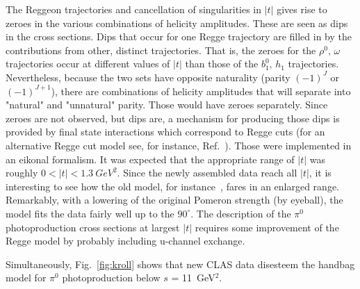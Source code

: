 \documentclass[aps,prc,onecolumn,floatfix,showpacs,preprintnumbers,amsmath,amssymb,superscriptaddress]{revtex4-1}
\begin{document}
The Reggeon trajectories and cancellation of singularities in $|t|$ 
gives rise to zeroes in the various combinations of helicity 
amplitudes. These are seen as dips in the cross sections. Dips that 
occur for one Regge trajectory are filled in by the contributions 
from other, distinct trajectories. That is, the zeroes for the 
$\rho^0, \, \omega$ trajectories occur at different values of $|t|$ 
than those of the $b_1^0, \, h_1$ trajectories. Nevertheless, 
because the two sets have opposite naturality (parity $(-1)^J$ or 
$(-1)^{J+1}$), there are combinations of helicity amplitudes that 
will separate into "natural" and "unnatural" parity.  Those would 
have zeroes separately. Since zeroes are not observed, but dips 
are, a mechanism for producing those dips is provided by final 
state interactions which correspond to Regge cuts (for an 
alternative Regge cut model see, for instance, Ref.~\cite{Laget}). 
Those were implemented in an eikonal formalism. It was expected 
that the appropriate range of $|t|$ was roughly $0 < |t| < 
1.3~GeV^2$. Since the newly assembled data reach all $|t|$, it is 
interesting to see how the old model, for instance~\cite{Goldstein}, 
fares in an enlarged range. Remarkably, with a lowering of the 
original Pomeron strength (by eyeball), the model fits the data 
fairly well up to the $90^\circ$.  The description of the $\pi^0$ 
photoproduction cross sections at largest $|t|$ requires some
improvement of the Regge model by probably including u-channel 
exchange.

Simultaneously, Fig.~\ref{fig:kroll} shows that new CLAS data 
disesteem the handbag model for $\pi^0$ photoproduction below 
$s$ = 11~GeV$^2$.
\end{document}
